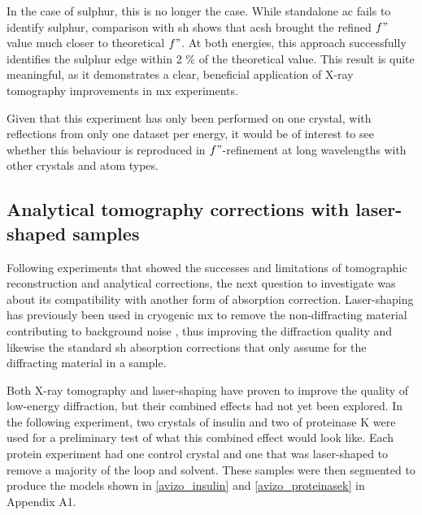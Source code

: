 In the case of sulphur, this is no longer the case. While standalone \ac{ac} fails to identify sulphur, comparison with \ac{sh} shows that \ac{acsh} brought the refined $f"$ value much closer to theoretical $f"$. At both energies, this approach successfully identifies the sulphur edge within 2 \% of the theoretical value. This result is quite meaningful, as it demonstrates a clear, beneficial application of X-ray tomography improvements in \ac{mx} experiments.%

Given that this experiment has only been performed on one crystal, with reflections from only one dataset per energy, it would be of interest to see whether this behaviour is reproduced in $f"$-refinement at long wavelengths with other crystals and atom types. %

\subsection{Analytical tomography corrections with laser-shaped samples}

Following experiments that showed the successes and limitations of tomographic reconstruction and analytical corrections, the next question to investigate was about its compatibility with another form of absorption correction. Laser-shaping has previously been used in cryogenic \ac{mx} to remove the non-diffracting material contributing to background noise \cite{Basu2019}, thus improving the diffraction quality and likewise the standard \ac{sh} absorption corrections that only assume for the diffracting material in a sample.

Both X-ray tomography and laser-shaping have proven to improve the quality of low-energy diffraction, but their combined effects had not yet been explored. In the following experiment, two crystals of insulin and two of proteinase K were used for a preliminary test of what this combined effect would look like. Each protein experiment had one control crystal and one that was laser-shaped to remove a majority of the loop and solvent. These samples were then segmented to produce the models shown in \cref{avizo_insulin} and \cref{avizo_proteinasek} in Appendix A1.

